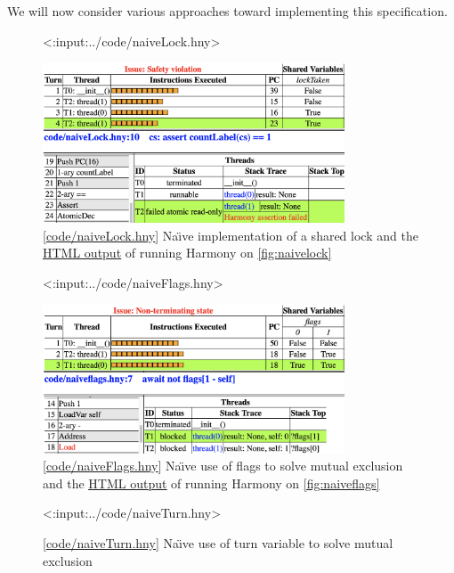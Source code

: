 \documentclass{report}
\newcommand{\harmonylink}[1]{%
[\href{https://harmony.cs.cornell.edu/#1}{\underline{#1}}]%
}
\newcommand{\harmonyref}[2]{%
\href{https://harmony.cs.cornell.edu/output/#1}{\underline{#2}}%
}
\newenvironment{code}{
\tcolorbox
}{
\endtcolorbox
}
\begin{document}
We will now consider various approaches toward implementing this
specification.

\begin{figure}
\begin{code}
<{:input:../code/naiveLock.hny}>
\end{code}
\begin{center}
\includegraphics[width=0.8\textwidth]{figures/naiveLock.png}
\end{center}
\caption{\harmonylink{code/naiveLock.hny} Na\"{\i}ve implementation of a shared lock and the \harmonyref{naiveLock.html}{HTML output} of running Harmony on \autoref{fig:naivelock}}
\label{fig:naivelock}
\end{figure}

\begin{figure}
\begin{code}
<{:input:../code/naiveFlags.hny}>
\end{code}
\begin{center}
\includegraphics[width=0.8\textwidth]{figures/naiveFlags.png}
\end{center}
\caption{\harmonylink{code/naiveFlags.hny} Na\"{\i}ve use of flags to solve mutual exclusion and the \harmonyref{naiveFlags.html}{HTML output} of running Harmony on \autoref{fig:naiveflags}}
\label{fig:naiveflags}
\end{figure}

\begin{figure}
\begin{code}
<{:input:../code/naiveTurn.hny}>
\end{code}
\caption{\harmonylink{code/naiveTurn.hny} Na\"{\i}ve use of turn variable to solve mutual exclusion}
\label{fig:naiveturn}
\end{figure}
\end{document}
